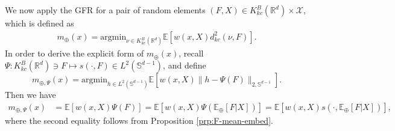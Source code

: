 \documentclass[11pt,reqno]{amsart}
\begin{document}
We now apply the GFR for a pair of random elements $(F,X) \in K_{kc}^B(\mathbb{R}^d) \times \mathcal{X}$, which is defined as 
\begin{align*}
m_{\oplus}(x)=\mathrm{argmin}_{\nu\in K_{kc}^B(\mathbb{R}^d)}\mathbb{E}[w(x,X)d_{kc}^2(\nu,F)].
\end{align*}
In order to derive the explicit form of $m_{\oplus}(x)$, recall $\Psi: K_{kc}^B(\mathbb{R}^d) \ni F \mapsto s(\cdot, F) \in L^2(\mathbb{S}^{d-1})$, and define 
\[
m_{\oplus,\Psi}(x) = \mathrm{argmin}_{h \in L^2(\mathbb{S}^{d-1})}\mathbb{E}[w(x,X)\|h - \Psi(F)\|_{2,\mathbb{S}^{d-1}}].
\]
Then we have 
\begin{align*}
m_{\oplus,\Psi}(x)
&= \mathbb{E}[w(x,X)\Psi(F)]
= \mathbb{E}[w(x,X)\Psi(\mathbb{E}_\oplus[F|X])]
= \mathbb{E}[w(x,X)s(\cdot, \mathbb{E}_\oplus[F|X])],
\end{align*}
where the second equality follows from Proposition \ref{prp:F-mean-embed}. 
\end{document}

